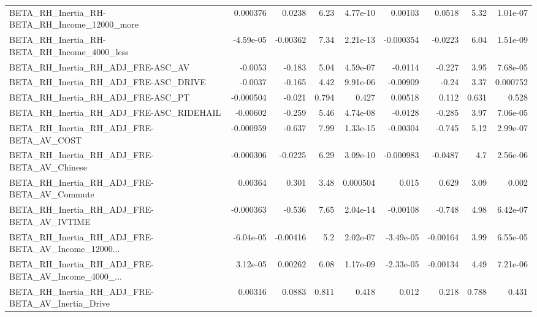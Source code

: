 \begin{tabular}{lrrrrrrrr}
BETA\_RH\_Inertia\_RH-BETA\_RH\_Income\_12000\_more       &    0.000376 &       0.0238 &     6.23 & 4.77e-10 &    0.00103 &      0.0518 &         5.32 &      1.01e-07 \\
BETA\_RH\_Inertia\_RH-BETA\_RH\_Income\_4000\_less        &   -4.59e-05 &     -0.00362 &     7.34 & 2.21e-13 &  -0.000354 &     -0.0223 &         6.04 &      1.51e-09 \\
BETA\_RH\_Inertia\_RH\_ADJ\_FRE-ASC\_AV                  &     -0.0053 &       -0.183 &     5.04 & 4.59e-07 &    -0.0114 &      -0.227 &         3.95 &      7.68e-05 \\
BETA\_RH\_Inertia\_RH\_ADJ\_FRE-ASC\_DRIVE               &     -0.0037 &       -0.165 &     4.42 & 9.91e-06 &   -0.00909 &       -0.24 &         3.37 &      0.000752 \\
BETA\_RH\_Inertia\_RH\_ADJ\_FRE-ASC\_PT                  &   -0.000504 &       -0.021 &    0.794 &    0.427 &    0.00518 &       0.112 &        0.631 &         0.528 \\
BETA\_RH\_Inertia\_RH\_ADJ\_FRE-ASC\_RIDEHAIL            &    -0.00602 &       -0.259 &     5.46 & 4.74e-08 &    -0.0128 &      -0.285 &         3.97 &      7.06e-05 \\
BETA\_RH\_Inertia\_RH\_ADJ\_FRE-BETA\_AV\_COST            &   -0.000959 &       -0.637 &     7.99 & 1.33e-15 &   -0.00304 &      -0.745 &         5.12 &      2.99e-07 \\
BETA\_RH\_Inertia\_RH\_ADJ\_FRE-BETA\_AV\_Chinese         &   -0.000306 &      -0.0225 &     6.29 & 3.09e-10 &  -0.000983 &     -0.0487 &          4.7 &      2.56e-06 \\
BETA\_RH\_Inertia\_RH\_ADJ\_FRE-BETA\_AV\_Commute         &     0.00364 &        0.301 &     3.48 & 0.000504 &      0.015 &       0.629 &         3.09 &         0.002 \\
BETA\_RH\_Inertia\_RH\_ADJ\_FRE-BETA\_AV\_IVTIME          &   -0.000363 &       -0.536 &     7.65 & 2.04e-14 &   -0.00108 &      -0.748 &         4.98 &      6.42e-07 \\
BETA\_RH\_Inertia\_RH\_ADJ\_FRE-BETA\_AV\_Income\_12000... &   -6.04e-05 &     -0.00416 &      5.2 & 2.02e-07 &  -3.49e-05 &    -0.00164 &         3.99 &      6.55e-05 \\
BETA\_RH\_Inertia\_RH\_ADJ\_FRE-BETA\_AV\_Income\_4000\_... &    3.12e-05 &      0.00262 &     6.08 & 1.17e-09 &  -2.33e-05 &    -0.00134 &         4.49 &      7.21e-06 \\
BETA\_RH\_Inertia\_RH\_ADJ\_FRE-BETA\_AV\_Inertia\_Drive   &     0.00316 &       0.0883 &    0.811 &    0.418 &      0.012 &       0.218 &        0.788 &         0.431 \\

\end{tabular}
